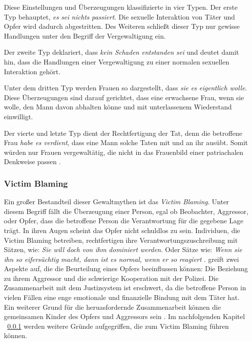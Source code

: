 Diese Einstellungen und Überzeugungen klassifizierte \textcite{Vergewaltigung_Typen_Burt_1991} in vier Typen. Der erste Typ behauptet, \textit{es sei nichts passiert}. Die sexuelle Interaktion von Täter und Opfer wird dadurch abgestritten. Des Weiteren schließt dieser Typ nur gewisse Handlungen unter den Begriff der Vergewaltigung ein. 

Der zweite Typ deklariert, dass \textit{kein Schaden entstanden sei} und deutet damit hin, dass die Handlungen einer Vergewaltigung zu einer normalen sexuellen Interaktion gehört.

Unter dem dritten Typ werden Frauen so dargestellt, dass \textit{sie es eigentlich wolle}. Diese Überzeugungen sind darauf gerichtet, dass eine erwachsene Frau, wenn sie wolle, den Mann davon abhalten könne und mit unterlassenem Wiederstand einwilligt.

Der vierte und letzte Typ dient der Rechtfertigung der Tat, denn die betroffene Frau \textit{habe es verdient}, dass eine Mann solche Taten mit und an ihr ausübt. Somit würden nur Frauen vergewaltätig, die nicht in das Frauenbild einer patriachalen Denkweise passen \parencite{Vergewaltigung_Typen_Burt_1991}.


\subsubsection{Victim Blaming}     \label{2.1.3.2}
Ein großer Bestandteil dieser Gewaltmythen ist das \textit{Victim Blaming}. Unter diesem Begriff fällt die Überzeugung einer Person, egal ob Beobachter, Aggressor, oder Opfer, dass die betroffene Person die Verantwortung für die gegebene Lage trägt. In ihren Augen scheint das Opfer nicht schuldlos zu sein. Individuen, die Victim Blaming betreiben, rechtfertigen ihre Verantwortungszuschreibung mit Sätzen, wie: \textit{Sie will doch von ihm dominiert werden}. Oder Sätze wie: \textit{Wenn sie ihn so eifersüchtig macht, dann ist es normal, wenn er so reagiert} \parencite{Peters2003}. \textcite{victim_blaming} greift zwei Aspekte auf, die die Beurteilung eines Opfers beeinflussen können: Die Beziehung zu ihrem Aggressor und die schwierige Kooperation mit der Polizei. Die Zusammenarbeit mit dem Justizsystem ist erschwert, da die betroffene Person in vielen Fällen eine enge emotionale und finanzielle Bindung mit dem Täter hat. Ein weiterer Grund für die heruasfordernde Zusammenarbeit können die gemeinsamen Kinder des Opfers und Aggressors sein \parencite{victim_blaming}. Im nachfolgenden Kapitel ~\ref{2.1.3.2} werden weitere Gründe aufgegriffen, die zum Victim Blaming führen können.



